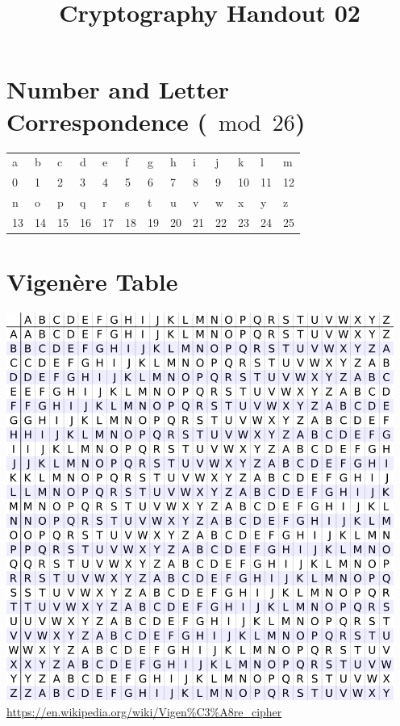 \documentclass[12pt]{amsart}
\makeatletter
\def\subtitle#1{\gdef\@subtitle{#1}}
\def\@subtitle{}
\theoremstyle{plain}
\theoremstyle{definition}
\theoremstyle{remark}
\newcommand{\bcen}{\begin{center}}
\newcommand{\ecen}{\end{center}}
\makeatother
\begin{document}
\onehalfspacing

\title[]{Cryptography Handout 02}
\subtitle{Vigen\`{e}re Cipher}
\maketitle

\section{Number and Letter Correspondence ($\bmod 26$)}
\bcen
\begin{tabular}{|p{.25in}|p{.25in}|p{.25in}|p{.25in}|p{.25in}|p{.25in}|p{.25in}|p{.25in}|p{.25in}|p{.25in}|p{.25in}|p{.25in}|p{.25in}|}\hline
a & b & c & d & e & f & g & h & i & j & k & l & m\\
0 & 1 & 2 & 3 & 4 & 5 & 6 & 7 & 8 & 9 & 10 & 11 & 12 \\ \hline
n & o & p & q & r & s & t & u & v & w & x & y & z\\
13 &14 & 15 & 16 & 17 & 18 & 19 & 20 & 21 & 22 & 23 & 24 & 25\\ \hline
\end{tabular}
\ecen

\section{Vigen\`{e}re Table}
\bcen
\includegraphics[width=5in]{Vigenere.png}
\url{https://en.wikipedia.org/wiki/Vigen%C3%A8re_cipher}
\ecen
\end{document}

